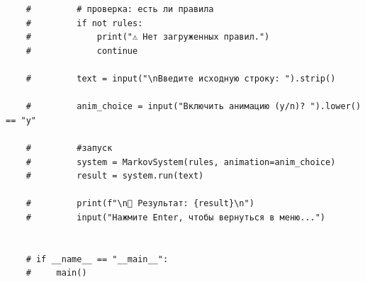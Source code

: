\begin{lstlisting}
	#         # проверка: есть ли правила
	#         if not rules:
	#             print("⚠️ Нет загруженных правил.")
	#             continue
	
	#         text = input("\nВведите исходную строку: ").strip()
	
	#         anim_choice = input("Включить анимацию (y/n)? ").lower() == "y"
	
	#         #запуск
	#         system = MarkovSystem(rules, animation=anim_choice)
	#         result = system.run(text)
	
	#         print(f"\n🏁 Результат: {result}\n")
	#         input("Нажмите Enter, чтобы вернуться в меню...")
	
	
	# if __name__ == "__main__":
	#     main()
	
\end{lstlisting}